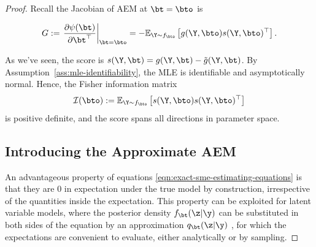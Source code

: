 \begin{proof}
Recall the Jacobian of AEM at \( \bt = \bto \) is

\[
G := \left. \frac{\partial \psi(\bt)}{\partial \bt^\top} \right|_{\bt = \bto}
= - \mathbb{E}_{\Y \sim f_{\bto}} \left[ g(\Y, \bto) s(\Y, \bto)^\top \right].
\]

As we've seen, the score is \( s(\Y, \bt) = g(\Y, \bt) - \tilde{g}(\Y, \bt) \). By Assumption~\eqref{ass:mle-identifiability}, the MLE is identifiable and asymptotically normal. Hence, the Fisher information matrix
\[
\mathcal{I}(\bto) := \mathbb{E}_{\Y \sim f_{\bto}} \left[ s(\Y, \bto) s(\Y, \bto)^\top \right]
\]
is positive definite, and the score spans all directions in parameter space. 
\newpage








































\newpage
\subsection{Introducing the Approximate AEM}
An advantageous property of equations \eqref{eqn:exact-sme-estimating-equations} is that they are 0 in expectation under the true model by construction, irrespective of the quantities inside the expectation. This property can be exploited for latent variable models, where the posterior density $f_\bt(\z|\y)$ can be substituted in both sides of the equation by an approximation $q_\bt(\z|\y)$ , for which the expectations are convenient to evaluate, either analytically or by sampling. 



\end{proof}
